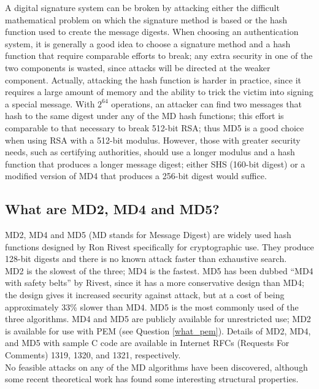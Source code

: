 A digital signature system can be broken by attacking either the
difficult mathematical problem on which the signature method is based
or the hash function used to create the message digests. When choosing
an authentication system, it is generally a good idea to choose a
signature method and a hash function that require comparable efforts to
break; any extra security in one of the two components is wasted, since
attacks will be directed at the weaker component. Actually, attacking
the hash function is harder in practice, since it requires a large
amount of memory and the ability to trick the victim into signing a
special message. With $2^{64}$ operations, an attacker can find two
messages that hash to the same digest under any of the MD hash
functions; this effort is comparable to that necessary to break 512-bit
RSA; thus MD5 is a good choice when using RSA with a 512-bit modulus.
However, those with greater security needs, such as certifying
authorities, should use a longer modulus and a hash function that
produces a longer message digest; either SHS (160-bit digest) or a
modified version of MD4 that produces a 256-bit digest would suffice.

\subsection{What are MD2, MD4 and MD5?}
\label{what_mds}

MD2, MD4 and MD5 (MD stands for Message Digest) are widely used hash
functions designed by Ron Rivest specifically for cryptographic use.
They produce 128-bit digests and there is no known attack faster than
exhaustive search.\\

MD2 is the slowest of the three; MD4 is the fastest. MD5 has been dubbed
``MD4 with safety belts'' by Rivest, since it has a more conservative
design than MD4; the design gives it increased security against attack, but
at a cost of being approximately 33\% slower than MD4. MD5 is the most
commonly used of the three algorithms. MD4 and MD5 are publicly available
for unrestricted use; MD2 is available for use with PEM (see Question
\ref{what_pem}). Details of MD2, MD4, and MD5 with sample C code are
available in Internet RFCs (Requests For Comments) 1319, 1320, and 1321,
respectively.\\

No feasible attacks on any of the MD algorithms have been discovered,
although some recent theoretical work has found some interesting
structural properties.

